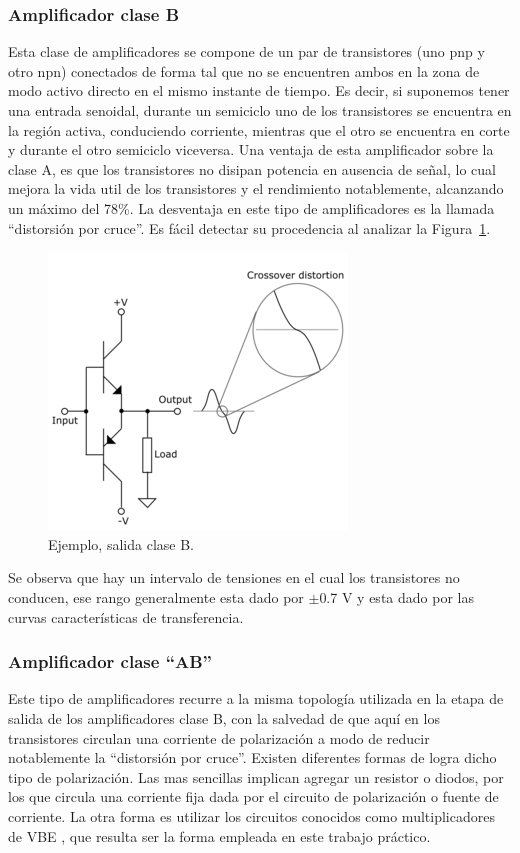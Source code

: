 \medskip 
\subsubsection*{Amplificador clase B}

Esta clase de amplificadores se compone de un par de transistores (uno pnp y otro npn) conectados de forma tal que no se encuentren ambos en la zona de modo activo directo en el mismo instante de tiempo. Es decir, si suponemos tener una entrada senoidal, durante un semiciclo uno de los transistores se encuentra en la región activa, conduciendo corriente, mientras que el otro se encuentra en corte y durante el otro semiciclo viceversa.
 Una ventaja de esta amplificador sobre la clase A, es que los transistores no disipan potencia en ausencia de señal, lo cual mejora la vida util de los transistores y el rendimiento notablemente, alcanzando un máximo del 78\%.
 La desventaja en este tipo de amplificadores es la llamada “distorsión por cruce”. Es fácil detectar su procedencia al analizar la Figura~\ref{ampliB}.

\begin{figure}[H]
\centering
\includegraphics[scale=0.8]{img/ampliB.png}
\caption{Ejemplo, salida clase B.}
\label{ampliB} 
\end{figure}


Se observa que hay un intervalo de tensiones en el cual los transistores no conducen, ese rango generalmente esta dado por $\pm$0.7 V y esta dado por las curvas características de transferencia.

\medskip 
\subsubsection*{Amplificador clase “AB”}


 Este tipo de amplificadores recurre a la misma topología utilizada en la etapa de salida de los amplificadores clase B, con la salvedad de que aquí en los transistores circulan una corriente de polarización a modo de reducir notablemente la “distorsión por cruce”.
 Existen diferentes formas de logra dicho tipo de polarización. Las mas sencillas implican agregar un resistor o diodos, por los que circula una corriente fija dada por el circuito de polarización o fuente de corriente. La otra forma es utilizar los circuitos conocidos como multiplicadores de VBE , que resulta ser la forma empleada en este trabajo práctico.

